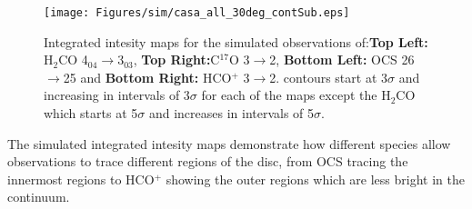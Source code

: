\documentclass[useAMS,usenatbib]{mn2e}
\begin{document}

%

\begin{figure}
 \texttt{[image: Figures/sim/casa\_all\_30deg\_contSub.eps]}

 \caption{Integrated intesity maps for the simulated observations of:{\bf Top Left:} H$_2$CO 4$_{04}\rightarrow$3$_{03}$, {\bf Top Right:}C$^{17}$O 3$\rightarrow$2, {\bf Bottom Left:} OCS 26$\rightarrow$25 and {\bf Bottom Right:} HCO$^+$ 3$\rightarrow$2. contours start at 3$\sigma$ and increasing in intervals of 3$\sigma$ for each of the maps except the H$_2$CO which starts at 5$\sigma$ and increases in intervals of 5$\sigma$.}
\end{figure}

The simulated integrated intesity maps demonstrate how different species allow observations to trace different regions of the disc, from OCS tracing the innermost regions to HCO$^+$ showing the outer regions which are less bright in the continuum.

%


%
\end{document}
